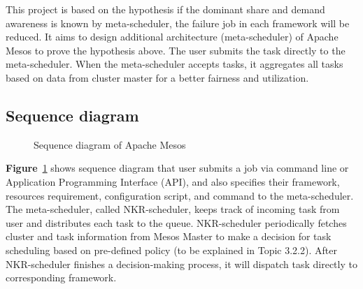 \documentclass[12pt,oneside,openright,a4paper]{cpe-english-project}
\begin{document}
\hspace{10mm}This project is based on the hypothesis if the dominant share and demand awareness is known by meta-scheduler, the failure job in each framework will be reduced. It aims to design additional architecture (meta-scheduler) of Apache Mesos to prove the hypothesis above. The user submits the task directly to the meta-scheduler. When the meta-scheduler accepts tasks, it aggregates all tasks based on data from cluster master for a better fairness and utilization.

\subsection{Sequence diagram} 

\begin{figure}[!h]\centering
  \setlength{\fboxrule}{0mm} %
  \setlength{\fboxsep}{0cm}
  \caption{Sequence diagram of Apache Mesos}\label{fig:SequenceDiagram}
\end{figure}

\hspace{10mm}\textbf{Figure}~\ref{fig:SequenceDiagram} shows sequence diagram that user submits a job via command line or Application Programming Interface (API), and also specifies their framework, resources requirement, configuration script, and command to the meta-scheduler. The meta-scheduler, called NKR-scheduler, keeps track of incoming task from user and distributes each task to the queue. NKR-scheduler periodically fetches cluster and task information from Mesos Master to make a decision for task scheduling based on pre-defined policy (to be explained in Topic 3.2.2).  After NKR-scheduler finishes a decision-making process, it will dispatch task directly to corresponding framework.
\end{document}
